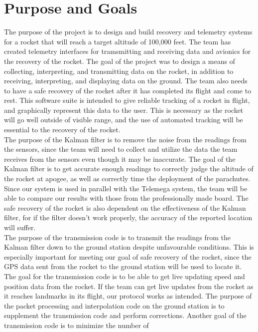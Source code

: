 \documentclass[onecolumn, draftclsnofoot,10pt, compsoc]{IEEEtran}
\begin{document}
\section {Purpose and Goals}
The purpose of the project is to design and build recovery and
telemetry systems for a rocket that will reach a target altitude of
100,000 feet.
The team has created telemetry interfaces for tramsmitting and receiving
data and avionics for the recovery of the rocket.
The goal of the project was to design a means of collecting,
interpreting, and transmitting data on the rocket, in addition to
receiving, interpreting, and displaying data on the ground.
The team also needs to have a safe recovery of the rocket after it has
completed its flight and come to rest.
This software suite is intended to give reliable tracking of a rocket
in flight, and graphically represent this data to the user.
This is necessary as the rocket will go well outside of visible range,
and the use of automated tracking will be essential to the recovery of
the rocket.\\
The purpose of the Kalman filter is to remove the noise from the
readings from the sensors, since the team will need to collect and utilize
the data the team receives from the sensors even though it may be inaccurate.
The goal of the Kalman filter is to get accurate enough readings to
correctly judge the altitude of the rocket at apogee, as well as
correctly time the deployment of the parachutes.
Since our system is used in parallel with the Telemega system, the team will
be able to compare our results with those from the professionally made
board.
The safe recovery of the rocket is also dependent on the effectiveness
of the Kalman filter, for if the filter doesn't work properly, the
accuracy of the reported location will suffer.\\
The purpose of the transmission code is to transmit the readings from
the Kalman filter down to the ground station despite unfavourable
conditions.
This is especially important for meeting our goal of safe recovery of
the rocket, since the GPS data sent from the rocket to the ground
station will be used to locate it.
The goal for the transmission code is to be able to get live updating
speed and position data from the rocket.
If the team can get live updates from the rocket as it reaches landmarks in
its flight, our protocol works as intended.
The purpose of the packet processing and interpolation code on the
ground station is to supplement the transmission code and perform
corrections.
Another goal of the transmission code is to minimize the number of
\end{document}
